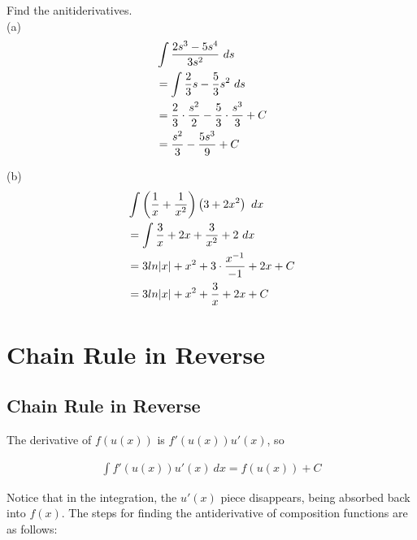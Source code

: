 \begin{exercise}\nonumber
    Find the anitiderivatives. \\

    (a)
    \begin{align}
         & \int {2s^3 - 5s^4 \over 3s^2} \ ds                                      \\
         & = \int {2 \over 3}s - {5 \over 3}s^2 \ ds                               \\
         & = {2 \over 3} \cdot {s^2 \over 2} - {5 \over 3} \cdot {s^3 \over 3} + C \\
         & = {s^2 \over 3} - {5s^3 \over 9} + C                                    \\
    \end{align}

    (b)
    \begin{align}
         & \int \left({1 \over x} + {1 \over x^2}\right)\left(3 + 2x^2\right) \ dx \\
         & = \int {3 \over x} + 2x + {3 \over x^2} + 2 \ dx                        \\
         & = 3ln|x| + x^2 + 3 \cdot {x^{-1} \over -1} + 2x + C                     \\
         & = 3ln|x| + x^2 + {3 \over x} + 2x + C
    \end{align}
\end{exercise}

\chapter{Chain Rule in Reverse}

\section{Chain Rule in Reverse}

The derivative of $ f(u(x)) $ is $ f'(u(x))u'(x) $, so \\

\begin{theorem}
    \begin{align}
        \int f'(u(x))u'(x) \ dx = f(u(x)) + C
    \end{align}
\end{theorem}

Notice that in the integration, the $ u'(x) $ piece disappears, being absorbed back into $ f(x) $. The steps for finding the antiderivative of composition functions are as follows: \\

